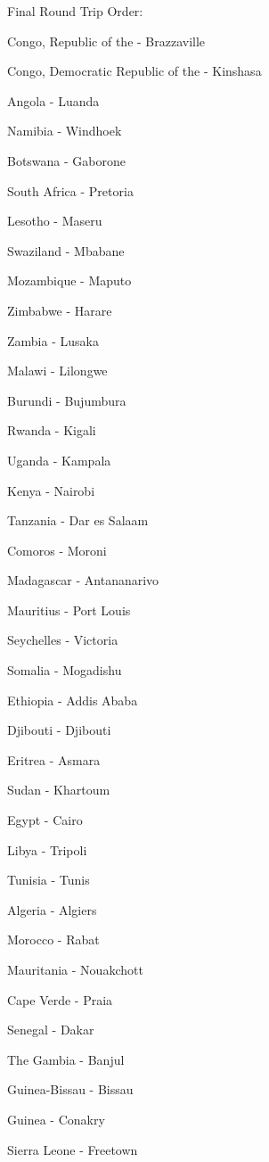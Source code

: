 \documentclass[12pt]{article}
\begin{document}
Final Round Trip Order:
\begin{multicols}{3}
\tiny\begin{enumerate*}
\item Congo, Republic of the - Brazzaville
\item Congo, Democratic Republic of the - Kinshasa
\item Angola - Luanda
\item Namibia - Windhoek
\item Botswana - Gaborone
\item South Africa - Pretoria
\item Lesotho - Maseru
\item Swaziland - Mbabane
\item Mozambique - Maputo
\item Zimbabwe - Harare
\item Zambia - Lusaka
\item Malawi - Lilongwe
\item Burundi - Bujumbura
\item Rwanda - Kigali
\item Uganda - Kampala
\item Kenya - Nairobi
\item Tanzania - Dar es Salaam
\item Comoros - Moroni
\item Madagascar - Antananarivo
\item Mauritius - Port Louis
\item Seychelles - Victoria
\item Somalia - Mogadishu
\item Ethiopia - Addis Ababa
\item Djibouti - Djibouti
\item Eritrea - Asmara
\item Sudan - Khartoum
\item Egypt - Cairo
\item Libya - Tripoli
\item Tunisia - Tunis
\item Algeria - Algiers
\item Morocco - Rabat
\item Mauritania - Nouakchott
\item Cape Verde - Praia
\item Senegal - Dakar
\item The Gambia - Banjul
\item Guinea-Bissau - Bissau
\item Guinea - Conakry
\item Sierra Leone - Freetown

\end{enumerate*}
\end{multicols}
\end{document}

